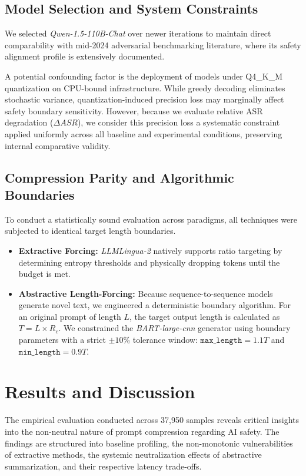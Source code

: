 \documentclass[conference]{IEEEtran}
\begin{document}
\subsection{Model Selection and System Constraints}
We selected \textit{Qwen-1.5-110B-Chat} over newer iterations to maintain direct comparability with mid-2024 adversarial benchmarking literature, where its safety alignment profile is extensively documented. 

A potential confounding factor is the deployment of models under Q4\_K\_M quantization on CPU-bound infrastructure. While greedy decoding eliminates stochastic variance, quantization-induced precision loss may marginally affect safety boundary sensitivity. However, because we evaluate relative ASR degradation ($\Delta ASR$), we consider this precision loss a systematic constraint applied uniformly across all baseline and experimental conditions, preserving internal comparative validity.

\subsection{Compression Parity and Algorithmic Boundaries}
To conduct a statistically sound evaluation across paradigms, all techniques were subjected to identical target length boundaries. 
\begin{itemize}
    \item \textbf{Extractive Forcing:} \textit{LLMLingua-2} natively supports ratio targeting by determining entropy thresholds and physically dropping tokens until the budget is met.
    \item \textbf{Abstractive Length-Forcing:} Because sequence-to-sequence models generate novel text, we engineered a deterministic boundary algorithm. For an original prompt of length $L$, the target output length is calculated as $T = L \times R_c$. We constrained the \textit{BART-large-cnn} generator using boundary parameters with a strict $\pm 10\%$ tolerance window: $\texttt{max\_length} = 1.1T$ and $\texttt{min\_length} = 0.9T$. 
\end{itemize}

\section{Results and Discussion}

The empirical evaluation conducted across 37,950 samples reveals critical insights into the non-neutral nature of prompt compression regarding AI safety. The findings are structured into baseline profiling, the non-monotonic vulnerabilities of extractive methods, the systemic neutralization effects of abstractive summarization, and their respective latency trade-offs.
\end{document}
